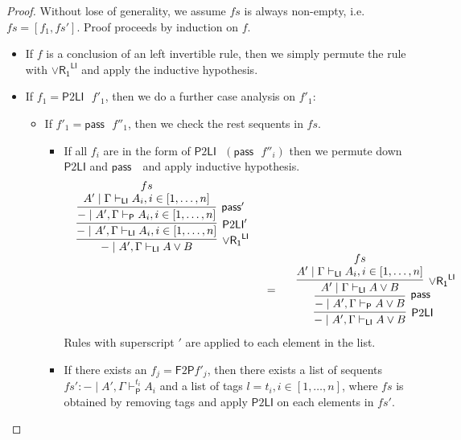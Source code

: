 \documentclass[submission,copyright,creativecommons]{eptcs}
\theoremstyle{definition}
\newcommand{\pass}{\mathsf{pass}}
\newcommand{\orrone}{\lor \mathsf{R_{1}}}
\newcommand{\LI}{\mathsf{LI}}
\newcommand{\Pass}{\mathsf{P}}
\newcommand{\F}{\mathsf{F}}
\newcommand{\proofbox}[1]{\begin{tabular}{l} #1 \end{tabular}}
\begin{document}
\begin{proof}
  Without lose of generality, we assume $fs$ is always non-empty, i.e. $fs = [f_1 , fs']$.
  Proof proceeds by induction on $f$.
  \begin{itemize}
    \item If $f$ is a conclusion of an left invertible rule, then we simply permute the rule with $\orrone^{\LI}$ and apply the inductive hypothesis.
    \item If $f_1 = \Pass 2 \LI \text{ } f'_1$, then we do a further case analysis on $f'_1$:
    \begin{itemize}
      \item If $f'_1 = \pass \text{ } f''_1$, then we check the rest sequents in $fs$. 
      \begin{itemize}
        \item If all $f_i$ are in the form of $\Pass 2 \LI \text{ } (\pass \text{ } f''_i)$ then we permute down $\Pass 2 \LI $ and $\pass \text{ }$ and apply inductive hypothesis.
        \begin{displaymath}
          \begin{array}{cc}
            \proofbox{
              \infer[\orrone^{\LI}]{- \mid A' , \Gamma \vdash_{\LI} A \lor B}{
                \infer[\Pass 2 \LI']{- \mid A' , \Gamma \vdash_{\LI} A_i , i \in [1 , \dots , n]}{
                  \infer[\pass']{- \mid A', \Gamma \vdash_{\Pass} A_i , i \in [1 , \dots , n]}{
                    \deduce{A' \mid \Gamma \vdash_{\LI} A_i , i \in [1 , \dots , n]}{fs}
                  }
                }
              }
            }
            \\[10pt]
            &
            =
            \quad
            \proofbox{
              \infer[\Pass 2 \LI]{- \mid A' , \Gamma \vdash_{\LI} A \lor B}{
                \infer[\pass]{- \mid A' , \Gamma \vdash_{\Pass} A \lor B}{
                  \infer[\orrone^{\LI}]{A' \mid \Gamma \vdash_{\LI} A \lor B}{
                    \deduce{A' \mid \Gamma \vdash_{\LI} A_i , i \in [1 , \dots , n]}{fs}
                  }
                }
              }
            }
          \end{array}
        \end{displaymath}
        Rules with superscript $'$ are applied to each element in the list.
        \item If there exists an $f_j = \F 2 \Pass f'_j$, then there exists a list of sequents $fs' : - \mid A' , \Gamma \vdash^{t_i}_{\Pass} A_i$ and a list of tags $l = t_i , i \in [1 , \dots , n]$, where $fs$ is obtained by removing tags and apply $\Pass 2 \LI$ on each elements in $fs'$.

\end{itemize}
\end{itemize}
\end{itemize}
\end{proof}
\end{document}
